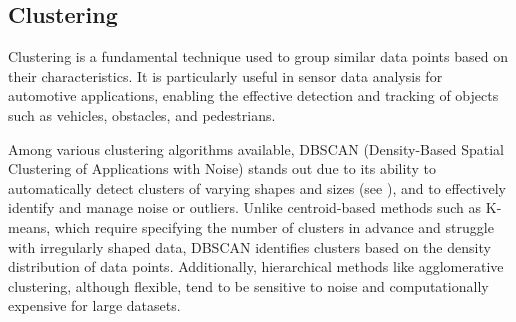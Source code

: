 
\subsection{Clustering}
Clustering is a fundamental technique used to group similar data points based on their characteristics. It is particularly useful in sensor data analysis for automotive applications, enabling the effective detection and tracking of objects such as vehicles, obstacles, and pedestrians.
\par
Among various clustering algorithms available, DBSCAN (Density-Based Spatial Clustering of Applications with Noise) stands out due to its ability to automatically detect clusters of varying shapes and sizes (see \cite{geeksforgeeks_dbscan}), and to effectively identify and manage noise or outliers. Unlike centroid-based methods such as K-means, which require specifying the number of clusters in advance and struggle with irregularly shaped data, DBSCAN identifies clusters based on the density distribution of data points. Additionally, hierarchical methods like agglomerative clustering, although flexible, tend to be sensitive to noise and computationally expensive for large datasets.

